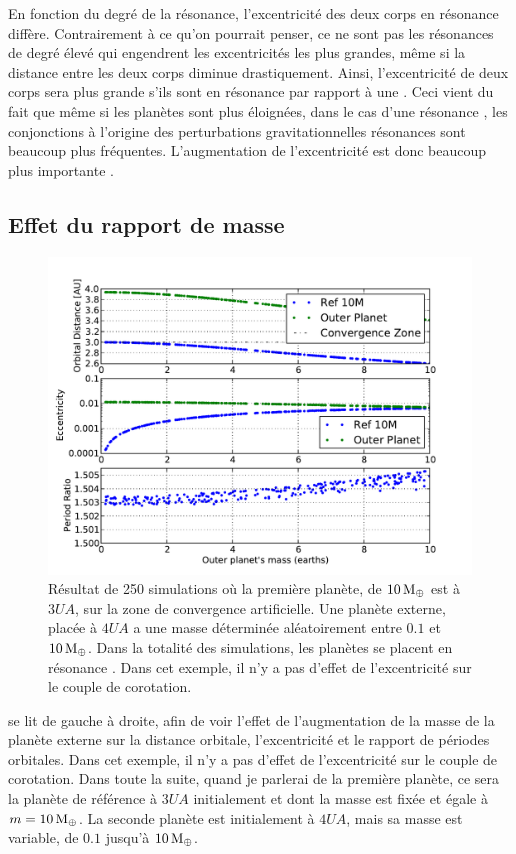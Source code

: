 En fonction du degré de la résonance, l'excentricité des deux corps en résonance diffère. Contrairement à ce qu'on pourrait
penser, ce ne sont pas les résonances de degré élevé qui engendrent les excentricités les plus grandes, même si la distance
entre les deux corps diminue drastiquement. Ainsi, l'excentricité de deux corps sera plus grande s'ils sont en résonance
 par rapport à une . Ceci vient du fait que même si les planètes sont plus éloignées, dans le cas d'une
résonance , les conjonctions à l'origine des perturbations gravitationnelles résonances sont beaucoup plus
fréquentes. L'augmentation de l'excentricité est donc beaucoup plus importante \citep{murray2000solar}. 

\subsection{Effet du rapport de masse}
\begin{figure}[htbp]
\centering
\includegraphics[width=0.75\linewidth]{figure/MMR_mass_ratio.pdf}
\caption[Effet du rapport de masse sur les propriétés d'une résonance.]{Résultat de 250 simulations où la première planète, de
$10\mathrm{\thinspace M_\oplus}$ est à $3\unit{UA}$, sur
la zone de convergence artificielle. Une planète externe, placée à $4\unit{UA}$ a une masse
déterminée aléatoirement entre $0.1$ et $10\mathrm{\thinspace M_\oplus}$. Dans la totalité des simulations, les planètes
se placent en résonance . Dans cet exemple, il n'y a pas d'effet de l'excentricité sur le
couple de corotation.}\label{fig:MMR_mass_ratio}
\end{figure}

 se lit de gauche à droite, afin de voir l'effet de l'augmentation de la masse de la planète externe
sur la distance orbitale, l'excentricité et le rapport de périodes orbitales. Dans cet exemple, il n'y a pas d'effet de
l'excentricité sur le couple de corotation. Dans toute la suite, quand je parlerai de la première planète, ce sera la planète de référence à $3\unit{UA}$ initialement et dont la masse est fixée et égale à $m=10\mathrm{\thinspace M_\oplus}$. La seconde planète est initialement à $4\unit{UA}$, mais sa masse est variable, de $0.1$ jusqu'à $10\mathrm{\thinspace M_\oplus}$.

